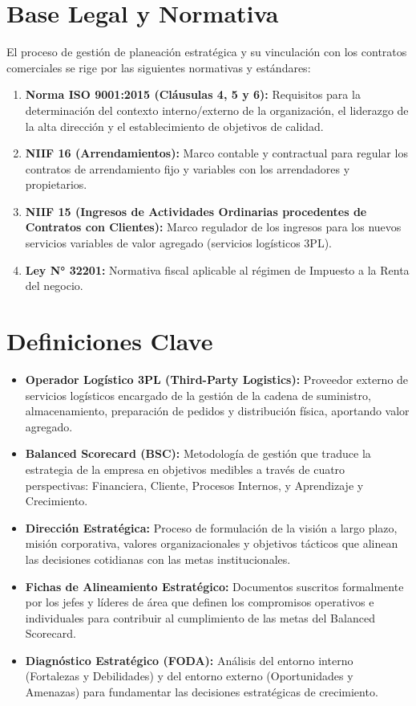 \documentclass[11pt,letterpaper]{report}
\begin{document}
\section{Base Legal y Normativa}
El proceso de gestión de planeación estratégica y su vinculación con los contratos comerciales se rige por las siguientes normativas y estándares:
\begin{enumerate}
  \item \textbf{Norma ISO 9001:2015 (Cláusulas 4, 5 y 6):} Requisitos para la determinación del contexto interno/externo de la organización, el liderazgo de la alta dirección y el establecimiento de objetivos de calidad.
  \item \textbf{NIIF 16 (Arrendamientos):} Marco contable y contractual para regular los contratos de arrendamiento fijo y variables con los arrendadores y propietarios.
  \item \textbf{NIIF 15 (Ingresos de Actividades Ordinarias procedentes de Contratos con Clientes):} Marco regulador de los ingresos para los nuevos servicios variables de valor agregado (servicios logísticos 3PL).
  \item \textbf{Ley N° 32201:} Normativa fiscal aplicable al régimen de Impuesto a la Renta del negocio.
\end{enumerate}

\section{Definiciones Clave}
\begin{itemize}
  \item \textbf{Operador Logístico 3PL (Third-Party Logistics):} Proveedor externo de servicios logísticos encargado de la gestión de la cadena de suministro, almacenamiento, preparación de pedidos y distribución física, aportando valor agregado.
  \item \textbf{Balanced Scorecard (BSC):} Metodología de gestión que traduce la estrategia de la empresa en objetivos medibles a través de cuatro perspectivas: Financiera, Cliente, Procesos Internos, y Aprendizaje y Crecimiento.
  \item \textbf{Dirección Estratégica:} Proceso de formulación de la visión a largo plazo, misión corporativa, valores organizacionales y objetivos tácticos que alinean las decisiones cotidianas con las metas institucionales.
  \item \textbf{Fichas de Alineamiento Estratégico:} Documentos suscritos formalmente por los jefes y líderes de área que definen los compromisos operativos e individuales para contribuir al cumplimiento de las metas del Balanced Scorecard.
  \item \textbf{Diagnóstico Estratégico (FODA):} Análisis del entorno interno (Fortalezas y Debilidades) y del entorno externo (Oportunidades y Amenazas) para fundamentar las decisiones estratégicas de crecimiento.
\end{itemize}
\end{document}

